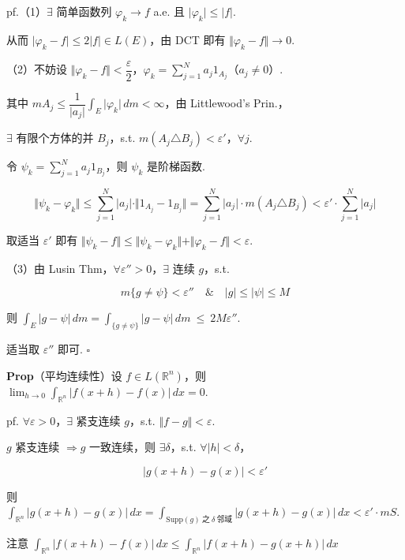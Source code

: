 \documentclass[11pt]{ctexart}
\theoremstyle{definition}
\begin{document}
pf.（1）$\exists$ 简单函数列 $\varphi_k \to f$ a.e. 且 $\vert \varphi_k\vert \leq \vert f\vert$.

从而 $\vert \varphi_k - f\vert \leq 2\vert f\vert \in L(E)$，由 DCT 即有 $\Vert \varphi_k - f\Vert \to 0$.

（2）不妨设 $\Vert \varphi_k - f\Vert < \dfrac{\varepsilon}{2}$，$\varphi_k = \sum\limits_{j=1}^{N} a_j 1_{A_j}$（$a_j \neq 0$）.

其中 $mA_j \leq \dfrac{1}{\vert a_j\vert} \int_E \vert \varphi_k\vert \, dm < \infty$，由 Littlewood's Prin.，

$\exists$ 有限个方体的并 $B_j$，s.t. $m(A_j \triangle B_j) < \varepsilon'$，$\forall j$.

令 $\psi_k = \sum\limits_{j=1}^{N} a_j 1_{B_j}$，则 $\psi_k$ 是阶梯函数.

\[
\Vert \psi_k - \varphi_k\Vert \leq \sum_{j=1}^{N} \vert a_j\vert \cdot \Vert 1_{A_j} - 1_{B_j}\Vert = \sum_{j=1}^{N} \vert a_j\vert \cdot m(A_j \triangle B_j) < \varepsilon' \cdot \sum_{j=1}^{N} \vert a_j\vert
\]

取适当 $\varepsilon'$ 即有 $\Vert \psi_k - f\Vert \leq \Vert \psi_k - \varphi_k\Vert + \Vert \varphi_k - f\Vert < \varepsilon$.

（3）由 Lusin Thm，$\forall \varepsilon'' > 0$，$\exists$ 连续 $g$，s.t.

\[
m\{g \neq \psi\} < \varepsilon'' \quad \& \quad \vert g\vert \leq \vert \psi\vert \leq M
\]

则 $\displaystyle\int_E \vert g - \psi\vert \, dm = \int_{\{g \neq \psi\}} \vert g - \psi\vert \, dm \ \leq\ 2M\varepsilon''$.

适当取 $\varepsilon''$ 即可. $\square$

\textbf{Prop}（平均连续性）设 $f \in L(\mathbb{R}^n)$，则 $\displaystyle\lim_{h \to 0} \int_{\mathbb{R}^n} \vert f(x+h) - f(x)\vert \, dx = 0$.

pf. $\forall \varepsilon > 0$，$\exists$ 紧支连续 $g$，s.t. $\Vert f - g\Vert < \varepsilon$.

$g$ 紧支连续 $\Rightarrow g$ 一致连续，则 $\exists \delta$，s.t. $\forall \vert h\vert < \delta$，

\[
\vert g(x + h) - g(x)\vert < \varepsilon'
\]

则 $\displaystyle\int_{\mathbb{R}^n} \vert g(x+h) - g(x)\vert \, dx = \int_{\mathrm{Supp}(g)\ \text{之}\ \delta\ \text{邻域}} \vert g(x+h) - g(x)\vert \, dx < \varepsilon' \cdot mS$.

注意 $\displaystyle\int_{\mathbb{R}^n} \vert f(x+h) - f(x)\vert \, dx \leq \int_{\mathbb{R}^n} \vert f(x+h) - g(x+h)\vert \, dx$
\end{document}
